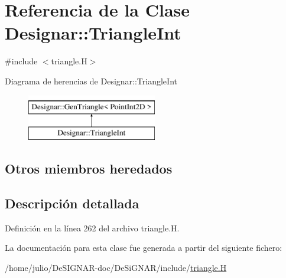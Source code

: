 \hypertarget{class_designar_1_1_triangle_int}{}\section{Referencia de la Clase Designar\+:\+:Triangle\+Int}
\label{class_designar_1_1_triangle_int}


{\ttfamily \#include $<$triangle.\+H$>$}

Diagrama de herencias de Designar\+:\+:Triangle\+Int\begin{figure}[H]
\begin{center}
\leavevmode
\includegraphics[height=2.000000cm]{class_designar_1_1_triangle_int}
\end{center}
\end{figure}
\subsection*{Otros miembros heredados}


\subsection{Descripción detallada}


Definición en la línea 262 del archivo triangle.\+H.



La documentación para esta clase fue generada a partir del siguiente fichero\+:\begin{DoxyCompactItemize}
\item 
/home/julio/\+De\+S\+I\+G\+N\+A\+R-\/doc/\+De\+Si\+G\+N\+A\+R/include/\hyperlink{triangle_8_h}{triangle.\+H}\end{DoxyCompactItemize}
